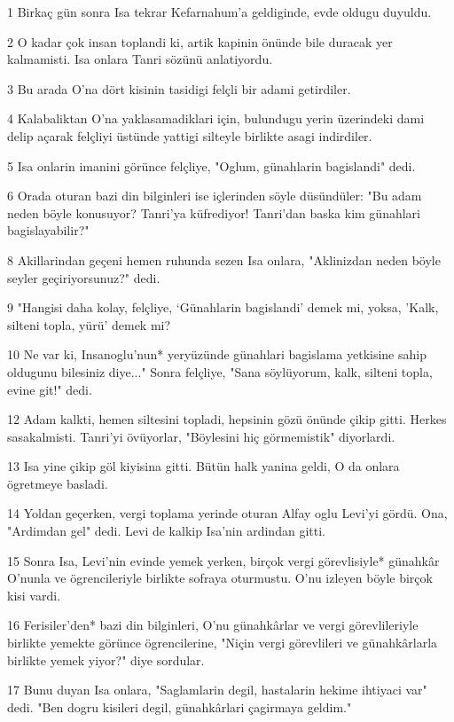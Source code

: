 \par 1 Birkaç gün sonra Isa tekrar Kefarnahum'a geldiginde, evde oldugu duyuldu.
\par 2 O kadar çok insan toplandi ki, artik kapinin önünde bile duracak yer kalmamisti. Isa onlara Tanri sözünü anlatiyordu.
\par 3 Bu arada O'na dört kisinin tasidigi felçli bir adami getirdiler.
\par 4 Kalabaliktan O'na yaklasamadiklari için, bulundugu yerin üzerindeki dami delip açarak felçliyi üstünde yattigi silteyle birlikte asagi indirdiler.
\par 5 Isa onlarin imanini görünce felçliye, "Oglum, günahlarin bagislandi" dedi.
\par 6 Orada oturan bazi din bilginleri ise içlerinden söyle düsündüler: "Bu adam neden böyle konusuyor? Tanri'ya küfrediyor! Tanri'dan baska kim günahlari bagislayabilir?"
\par 8 Akillarindan geçeni hemen ruhunda sezen Isa onlara, "Aklinizdan neden böyle seyler geçiriyorsunuz?" dedi.
\par 9 "Hangisi daha kolay, felçliye, `Günahlarin bagislandi' demek mi, yoksa, 'Kalk, silteni topla, yürü' demek mi?
\par 10 Ne var ki, Insanoglu'nun* yeryüzünde günahlari bagislama yetkisine sahip oldugunu bilesiniz diye..." Sonra felçliye, "Sana söylüyorum, kalk, silteni topla, evine git!" dedi.
\par 12 Adam kalkti, hemen siltesini topladi, hepsinin gözü önünde çikip gitti. Herkes sasakalmisti. Tanri'yi övüyorlar, "Böylesini hiç görmemistik" diyorlardi.
\par 13 Isa yine çikip göl kiyisina gitti. Bütün halk yanina geldi, O da onlara ögretmeye basladi.
\par 14 Yoldan geçerken, vergi toplama yerinde oturan Alfay oglu Levi'yi gördü. Ona, "Ardimdan gel" dedi. Levi de kalkip Isa'nin ardindan gitti.
\par 15 Sonra Isa, Levi'nin evinde yemek yerken, birçok vergi görevlisiyle* günahkâr O'nunla ve ögrencileriyle birlikte sofraya oturmustu. O'nu izleyen böyle birçok kisi vardi.
\par 16 Ferisiler'den* bazi din bilginleri, O'nu günahkârlar ve vergi görevlileriyle birlikte yemekte görünce ögrencilerine, "Niçin vergi görevlileri ve günahkârlarla birlikte yemek yiyor?" diye sordular.
\par 17 Bunu duyan Isa onlara, "Saglamlarin degil, hastalarin hekime ihtiyaci var" dedi. "Ben dogru kisileri degil, günahkârlari çagirmaya geldim."
